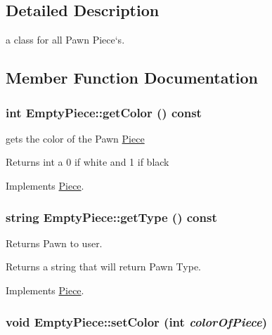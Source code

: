 \subsection{Detailed Description}
a class for all Pawn Piece`s. 

\subsection{Member Function Documentation}
\hypertarget{classEmptyPiece_aa0ae8e05e0471cf05e17bc9f56e30188}{
\subsubsection[{getColor}]{\setlength{\rightskip}{0pt plus 5cm}int EmptyPiece::getColor () const}}
\label{classEmptyPiece_aa0ae8e05e0471cf05e17bc9f56e30188}


gets the color of the Pawn \hyperlink{classPiece}{Piece} \begin{DoxyReturn}{Returns}
int a 0 if white and 1 if black 
\end{DoxyReturn}


Implements \hyperlink{classPiece_a1376072d4815719e60253ce5688df95c}{Piece}.\hypertarget{classEmptyPiece_ad71f9165591337d5df65c4f2500e2d36}{
\subsubsection[{getType}]{\setlength{\rightskip}{0pt plus 5cm}string EmptyPiece::getType () const}}
\label{classEmptyPiece_ad71f9165591337d5df65c4f2500e2d36}


Returns Pawn to user. \begin{DoxyReturn}{Returns}
a string that will return Pawn Type. 
\end{DoxyReturn}


Implements \hyperlink{classPiece_a5b88fcd786bb30b345b24fbc3ab24ab9}{Piece}.\hypertarget{classEmptyPiece_ae46e7ddf6275c1508528e06929cf2660}{
\subsubsection[{setColor}]{\setlength{\rightskip}{0pt plus 5cm}void EmptyPiece::setColor (int {\em colorOfPiece})}}
\label{classEmptyPiece_ae46e7ddf6275c1508528e06929cf2660}


